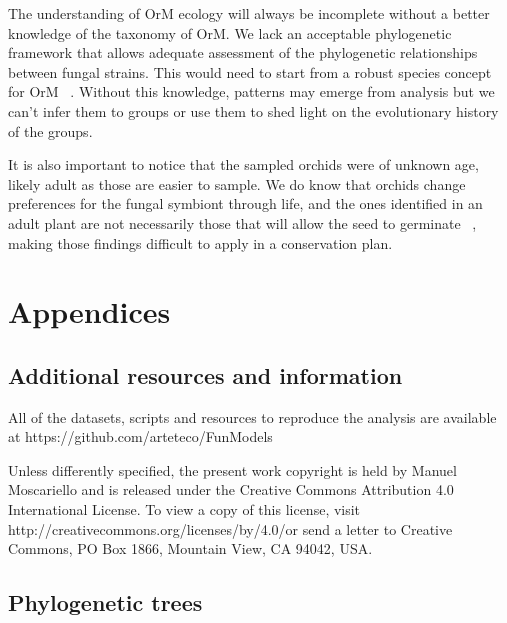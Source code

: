 The understanding of OrM ecology will always be incomplete without a better knowledge of the taxonomy of OrM. We lack an acceptable phylogenetic framework that allows adequate assessment of the phylogenetic relationships between fungal strains. This would need to start from a robust species concept for OrM ~\citep{jacquemyn2017}. Without this knowledge, patterns may emerge from analysis but we can't infer them to groups or use them to shed light on the evolutionary history of the groups.

It is also important to notice that the sampled orchids were of unknown age, likely adult as those are easier to sample. We do know that orchids change preferences for the fungal symbiont through life, and the ones identified in an adult plant are not necessarily those that will allow the seed to germinate ~\citep{meng2019}, making those findings difficult to apply in a conservation plan.

\part{Appendices}
\label{appendices}

\chapter{Additional resources and information}
\label{additionalresourcesandinformation}

All of the datasets, scripts and resources to reproduce the analysis are available at https:\slash \slash github.com\slash arteteco\slash FunModels

Unless differently specified, the present work copyright is held by Manuel Moscariello and is released under the Creative Commons Attribution 4.0 International License. To view a copy of this license, visit http:\slash \slash creativecommons.org\slash licenses\slash by\slash 4.0\slash  or send a letter to Creative Commons, PO Box 1866, Mountain View, CA 94042, USA.

\chapter{Phylogenetic trees}
\label{phylogenetictrees}

